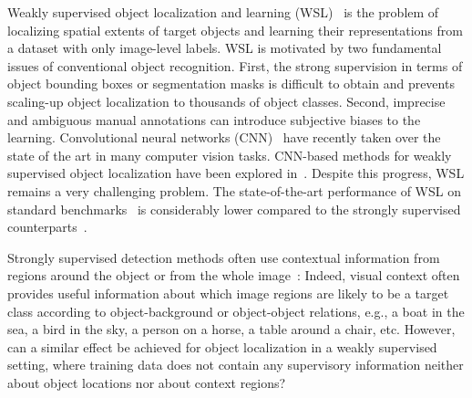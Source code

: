 
Weakly supervised object localization and learning
(WSL)~\cite{Wang:2014tg,Cinbis:2015wn} is the problem of localizing spatial
extents of target objects and learning their representations from a dataset with
only image-level labels. %
WSL is motivated by two fundamental issues of conventional object recognition.
First, the strong supervision in terms of object bounding boxes or segmentation
masks is difficult to obtain and prevents scaling-up object localization to
thousands of object classes. Second, imprecise and ambiguous manual annotations
can introduce subjective biases to the learning. 
Convolutional neural networks (CNN)~\cite{LeCun:1989bx,Krizhevsky:2012wl}
have recently taken over the state of the art in many computer vision tasks.
CNN-based methods for weakly supervised object localization have been explored
in~\cite{Oquab:2015us,Bilen:2015uo}.
Despite this progress, WSL remains a very challenging problem. The state-of-the-art performance
of WSL on standard benchmarks~\cite{Wang:2014tg,Cinbis:2015wn,Bilen:2015uo} is considerably lower compared to the
strongly supervised counterparts~\cite{Girshick:2016ig,ren15fasterrcnn,Gidaris:2015cx}. 


Strongly supervised detection methods often use contextual information from regions around the object or from the whole 
image~\cite{Torralba:2003wk,Rabinovich:2007wy,Felzenszwalb:2009wx,Girshick:2016ig,Gidaris:2015cx, desai09}:
Indeed, visual context often provides useful information about which image regions are likely to
be a target class according to object-background or object-object relations,
e.g., a boat in the sea, a bird in the sky, a person on a horse, a table around
a chair, etc. However, can a similar effect be achieved for object localization
in a weakly supervised setting, where training data does not contain any
supervisory information neither about object locations nor about context regions?

